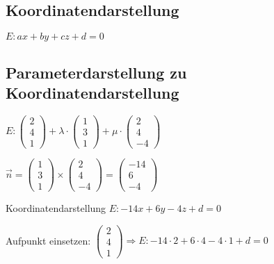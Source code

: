 \begin{multicols*}{3}
    \subsection{Koordinatendarstellung}
    {$E: ax + by + cz + d = 0 $}

    \subsection{Parameterdarstellung zu Koordinatendarstellung}

    $ E: \begin{pmatrix}
            2 \\
            4 \\
            1
        \end{pmatrix} + \lambda \cdot
        \begin{pmatrix}
            1 \\
            3 \\
            1
        \end{pmatrix} + \mu \cdot
        \begin{pmatrix}
            2 \\
            4 \\
            -4
        \end{pmatrix}$

    $\vec{n}=
        \begin{pmatrix}
            1 \\
            3 \\
            1
        \end{pmatrix} \times \begin{pmatrix}
            2 \\
            4 \\
            -4
        \end{pmatrix} = \begin{pmatrix}
            -14 \\
            6   \\
            -4
        \end{pmatrix} $

     Koordinatendarstellung $ E: -14x + 6y - 4z + d = 0$

     Aufpunkt einsetzen: $\begin{pmatrix}
            2 \\
            4 \\
            1
        \end{pmatrix} 	\Rightarrow  E: -14 \cdot 2  + 6 \cdot 4 - 4\cdot 1 + d = 0 $


\end{multicols*}
